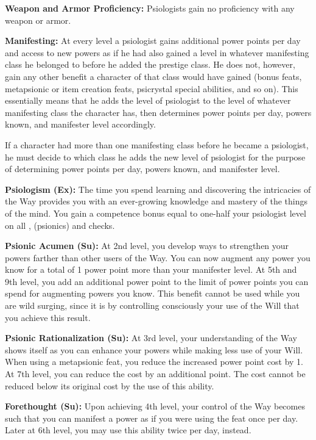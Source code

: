{
\textbf{Weapon and Armor Proficiency:} Psiologists gain no proficiency with any weapon or armor.

\textbf{Manifesting:} At every level a psiologist gains additional power points per day and access to new powers as if he had also gained a level in whatever manifesting class he belonged to before he added the prestige class. He does not, however, gain any other benefit a character of that class would have gained (bonus feats, metapsionic or item creation feats, psicrystal special abilities, and so on). This essentially means that he adds the level of psiologist to the level of whatever manifesting class the character has, then determines power points per day, powers known, and manifester level accordingly.

If a character had more than one manifesting class before he became a psiologist, he must decide to which class he adds the new level of psiologist for the purpose of determining power points per day, powers known, and manifester level.

\textbf{Psiologism (Ex):} The time you spend learning and discovering the intricacies of the Way provides you with an ever-growing knowledge and mastery of the things of the mind. You gain a competence bonus equal to one-half your psiologist level on all ,  (psionics) and  checks.

\textbf{Psionic Acumen (Su):} At 2nd level, you develop ways to strengthen your powers farther than other users of the Way. You can now augment any power you know for a total of 1 power point more than your manifester level. At 5th and 9th level, you add an additional power point to the limit of power points you can spend for augmenting powers you know. This benefit cannot be used while you are wild surging, since it is by controlling consciously your use of the Will that you achieve this result.

\textbf{Psionic Rationalization (Su):} At 3rd level, your understanding of the Way shows itself as you can enhance your powers while making less use of your Will. When using a metapsionic feat, you reduce the increased power point cost by 1. At 7th level, you can reduce the cost by an additional point. The cost cannot be reduced below its original cost by the use of this ability.

\textbf{Forethought (Su):} Upon achieving 4th level, your control of the Way becomes such that you can manifest a power as if you were using the  feat once per day. Later at 6th level, you may use this ability twice per day, instead.

}
